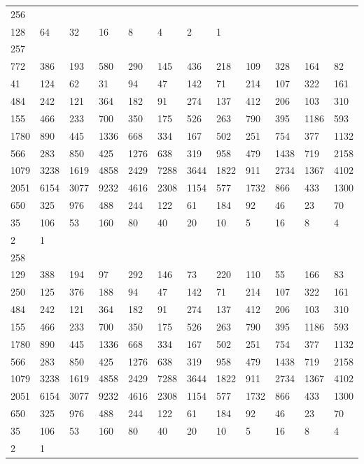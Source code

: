 \begin{longtable}{llllllllllll}
256&&&&&&&&&&&\\
128& 64& 32& 16& 8& 4& 2& 1& \\

257&&&&&&&&&&&\\
772& 386& 193& 580& 290& 145& 436& 218& 109& 328& 164& 82\\
41& 124& 62& 31& 94& 47& 142& 71& 214& 107& 322& 161\\
484& 242& 121& 364& 182& 91& 274& 137& 412& 206& 103& 310\\
155& 466& 233& 700& 350& 175& 526& 263& 790& 395& 1186& 593\\
1780& 890& 445& 1336& 668& 334& 167& 502& 251& 754& 377& 1132\\
566& 283& 850& 425& 1276& 638& 319& 958& 479& 1438& 719& 2158\\
1079& 3238& 1619& 4858& 2429& 7288& 3644& 1822& 911& 2734& 1367& 4102\\
2051& 6154& 3077& 9232& 4616& 2308& 1154& 577& 1732& 866& 433& 1300\\
650& 325& 976& 488& 244& 122& 61& 184& 92& 46& 23& 70\\
35& 106& 53& 160& 80& 40& 20& 10& 5& 16& 8& 4\\
2& 1& \\

258&&&&&&&&&&&\\
129& 388& 194& 97& 292& 146& 73& 220& 110& 55& 166& 83\\
250& 125& 376& 188& 94& 47& 142& 71& 214& 107& 322& 161\\
484& 242& 121& 364& 182& 91& 274& 137& 412& 206& 103& 310\\
155& 466& 233& 700& 350& 175& 526& 263& 790& 395& 1186& 593\\
1780& 890& 445& 1336& 668& 334& 167& 502& 251& 754& 377& 1132\\
566& 283& 850& 425& 1276& 638& 319& 958& 479& 1438& 719& 2158\\
1079& 3238& 1619& 4858& 2429& 7288& 3644& 1822& 911& 2734& 1367& 4102\\
2051& 6154& 3077& 9232& 4616& 2308& 1154& 577& 1732& 866& 433& 1300\\
650& 325& 976& 488& 244& 122& 61& 184& 92& 46& 23& 70\\
35& 106& 53& 160& 80& 40& 20& 10& 5& 16& 8& 4\\
2& 1& \\


\end{longtable}
